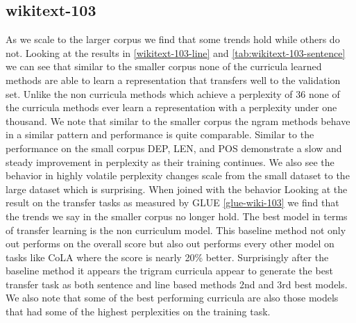 \subsection{wikitext-103}
As we scale to the larger corpus we find that some trends hold while others do not. Looking at the results in \ref{wikitext-103-line} and \ref{tab:wikitext-103-sentence} we can see that similar to the smaller corpus none of the curricula learned methods are able to learn a representation that transfers well to the validation set. Unlike the non curricula methods which achieve a perplexity of 36 none of the curricula methods ever learn a representation with a perplexity under one thousand. We note that similar to the smaller corpus the ngram methods behave in a similar pattern and performance is quite comparable. Similar to the performance on the small corpus DEP, LEN, and POS demonstrate a slow and steady improvement in perplexity as their training continues. We also see the behavior in highly volatile perplexity changes scale from the small dataset to the large dataset which is surprising. When joined with the behavior
Looking at the result on the transfer tasks as measured by GLUE \ref{glue-wiki-103} we find that the trends we say in the smaller corpus no longer hold. The best model in terms of transfer learning is the non curriculum model. This baseline method not only out performs on the overall score but also out performs every other model on tasks like CoLA where the score is nearly 20\% better. Surprisingly after the baseline method it appears the trigram curricula appear to generate the best transfer task as both sentence and line based methods 2nd and 3rd best models. We also note that some of the best performing curricula are also those models that had some of the highest perplexities on the training task.

